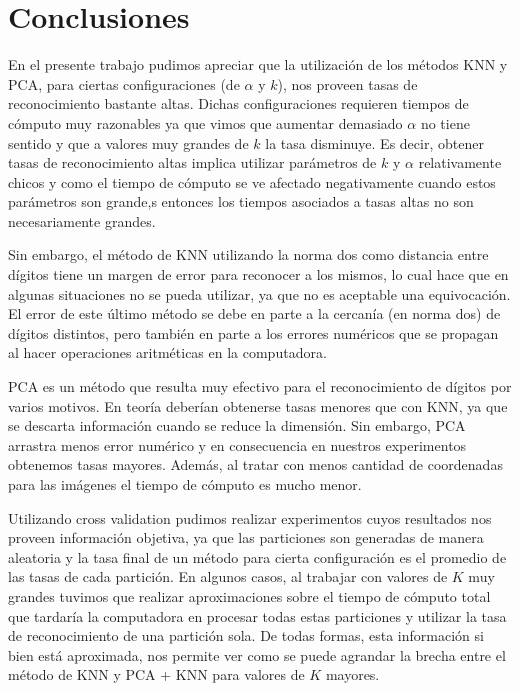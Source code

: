 \section{Conclusiones}

En el presente trabajo pudimos apreciar que la utilización de los métodos KNN y PCA, para ciertas configuraciones (de $\alpha$ y $k$), nos proveen tasas de reconocimiento bastante altas. Dichas configuraciones requieren tiempos de cómputo muy razonables ya que vimos que aumentar demasiado $\alpha$ no tiene sentido y que a valores muy grandes de $k$ la tasa disminuye. Es decir, obtener tasas de reconocimiento altas implica utilizar parámetros de $k$ y $\alpha$ relativamente chicos y como el tiempo de cómputo se ve afectado negativamente cuando estos parámetros son grande,s entonces los tiempos asociados a tasas altas no son necesariamente grandes.

Sin embargo, el método de KNN utilizando la norma dos como distancia entre dígitos tiene un margen de error para reconocer a los mismos, lo cual hace que en algunas situaciones no se pueda utilizar, ya que no es aceptable una equivocación. El error de este último método se debe en parte a la cercanía (en norma dos) de dígitos distintos, pero también en parte a los errores numéricos que se propagan al hacer operaciones aritméticas en la computadora.

PCA es un método que resulta muy efectivo para el reconocimiento de dígitos por varios motivos. En teoría deberían obtenerse tasas menores que con KNN, ya que se descarta información cuando se reduce la dimensión. Sin embargo, PCA arrastra menos error numérico y en consecuencia en nuestros experimentos obtenemos tasas mayores. Además, al tratar con menos cantidad de coordenadas para las imágenes el tiempo de cómputo es mucho menor.

Utilizando cross validation pudimos realizar experimentos cuyos resultados nos proveen información objetiva, ya que las particiones son generadas de manera aleatoria y la tasa final de un método para cierta configuración es el promedio de las tasas de cada partición. En algunos casos, al trabajar con valores de $K$ muy grandes tuvimos que realizar aproximaciones sobre el tiempo de cómputo total que tardaría la computadora en procesar todas estas particiones y utilizar la tasa de reconocimiento de una partición sola. De todas formas, esta información si bien está aproximada, nos permite ver como se puede agrandar la brecha entre el método de KNN y PCA + KNN para valores de $K$ mayores.

